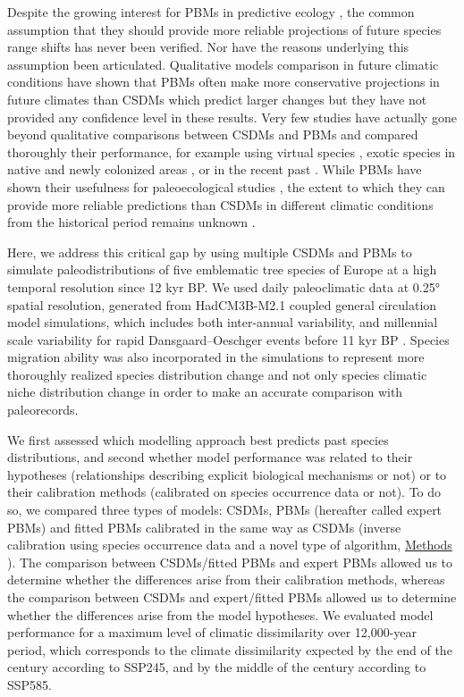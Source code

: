 \documentclass[pdflatex, sn-nature]{sn-jnl}%
\begin{document}
Despite the growing interest for PBMs in predictive ecology \cite{Connolly2017, Urban2016, Pilowsky2022}, the common assumption that they should provide more reliable projections of future species range shifts has never been verified. Nor have the reasons underlying this assumption been articulated. Qualitative models comparison in future climatic conditions have shown that PBMs often make more conservative projections in future climates than CSDMs which predict larger changes \cite{Morin2009, Cheaib2012, Gritti2013} but they have not provided any confidence level in these results. Very few studies have actually gone beyond qualitative comparisons between CSDMs and PBMs and compared thoroughly their performance, for example using virtual species \cite{Zurell2016}, exotic species in native and newly colonized areas \cite{Higgins2020}, or in the recent past \cite{Fordham2018}. 
While PBMs have shown their usefulness for paleoecological studies \cite{Saltre2013, Ruosch2016, Schwoerer2014}, the extent to which they can provide more reliable predictions than CSDMs in different climatic conditions from the historical period remains unknown \cite{UribeRivera2023, Briscoe2019}. 

Here, we address this critical gap by using multiple CSDMs and PBMs to simulate paleodistributions of five emblematic tree species of Europe at a high temporal resolution since 12 kyr BP. We used daily paleoclimatic data at 0.25° spatial resolution, generated from HadCM3B-M2.1 coupled general circulation model simulations, which includes both inter-annual variability, and millennial scale variability for rapid Dansgaard–Oeschger events before 11 kyr BP \cite{Armstrong2019}. Species migration ability was also incorporated in the simulations to represent more thoroughly realized species distribution change and not only species climatic niche distribution change in order to make an accurate comparison with paleorecords.

We first assessed which modelling approach best predicts past species distributions, and second whether model performance was related to their hypotheses (relationships describing explicit biological mechanisms or not) or to their calibration methods (calibrated on species occurrence data or not). To do so, we compared three types of models: CSDMs, PBMs (hereafter called expert PBMs) and fitted PBMs calibrated in the same way as CSDMs (inverse calibration using species occurrence data and a novel type of algorithm, \hyperref[methods]{Methods} \citep{VanderMeersch2023}). The comparison between CSDMs/fitted PBMs and expert PBMs allowed us to determine whether the differences arise from their calibration methods, whereas the comparison between CSDMs and expert/fitted PBMs allowed us to determine whether the differences arise from the model hypotheses. We evaluated model performance for a maximum level of climatic dissimilarity over 12,000-year period,  which corresponds to the climate dissimilarity expected by the end of the century according to SSP245, and by the middle of the century according to SSP585.
\end{document}
